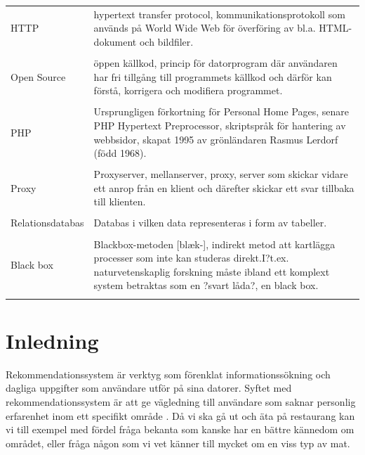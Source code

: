 \documentclass[a4paper,11pt]{article}
\begin{document}
{\begin{tabular}{l p{12cm} }
	HTTP & hypertext transfer protocol, kommunikationsprotokoll som används på World Wide Web för överföring av bl.a. HTML-dokument och bildfiler.	 \\\\
	
	Open Source & öppen källkod, princip för datorprogram där användaren har fri tillgång till programmets källkod och därför kan förstå, korrigera och modifiera programmet. \\\\
	
	PHP & Ursprungligen förkortning för Personal Home Pages, senare PHP Hypertext Preprocessor, skriptspråk för hantering av webbsidor, skapat 1995 av grönländaren Rasmus Lerdorf (född 1968). \\\\
	
	Proxy & Proxyserver, mellanserver, proxy, server som skickar vidare ett anrop från en klient och därefter skickar ett svar tillbaka till klienten. \\\\
	
	Relationsdatabas &  Databas i vilken data representeras i form av tabeller.  \\\\
	
	Black box & Blackbox-metoden [blæk-], indirekt metod att kartlägga processer som inte kan studeras direkt.I?t.ex. naturvetenskaplig forskning måste ibland ett komplext system betraktas som en ?svart låda?, en black box. \\\\
	
\end{tabular}



\newpage
\mbox{}
\newpage
\tableofcontents
\newpage
\ifodd\value{page}\else\mbox{}\newpage\fi
\setcounter{page}{1}
\renewcommand{\thepage}{\rempage}
%


\section{Inledning}

Rekommendationssystem är verktyg som förenklat informationssökning och dagliga uppgifter som användare utför på sina datorer. Syftet med rekommendationssystem är att ge vägledning till användare som saknar personlig erfarenhet inom ett specifikt område \cite{Resnick}. Då vi ska gå ut och äta på restaurang kan vi till exempel med fördel fråga bekanta som kanske har en bättre kännedom om området, eller fråga någon som vi vet känner till mycket om en viss typ av mat.


}
\end{document}
